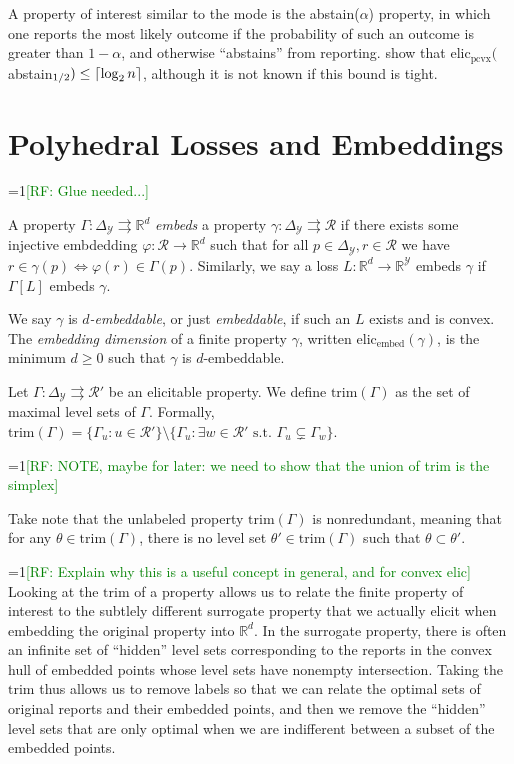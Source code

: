 \documentclass[anon,12pt]{colt2019}
\newcommand{\Comments}{1}
\newcommand{\mynote}[2]{\ifnum\Comments=1\textcolor{#1}{#2}\fi}
\newcommand{\raf}[1]{\mynote{green}{[RF: #1]}}
\newcommand{\reals}{\mathbb{R}}
\newcommand{\prop}[1]{\Gamma[#1]}
\newcommand{\elicpoly}{\mathrm{elic}_\mathrm{pcvx}}
\newcommand{\elicembed}{\mathrm{elic}_\mathrm{embed}}
\newcommand{\simplex}{\Delta_\Y}
\newcommand{\R}{\mathcal{R}}
\newcommand{\Y}{\mathcal{Y}}
\newcommand{\toto}{\rightrightarrows}
\newcommand{\trim}{\mathrm{trim}}
\DeclarePairedDelimiter\ceil{\lceil}{\rceil}
\begin{document}
A property of interest similar to the mode is the abstain($\alpha$) property, in which one reports the most likely outcome if the probability of such an outcome is greater than $1-\alpha$, and otherwise ``abstains'' from reporting.
\cite{ramaswamy2018consistent} show that $\elicpoly($abstain$_{1/2}) \leq \ceil{\log_2 n}$, although it is not known if this bound is tight.


\section{Polyhedral Losses and Embeddings}

\raf{Glue needed...}
\begin{definition}
  A property $\Gamma : \simplex \toto \reals^d$ \emph{embeds} a property $\gamma : \simplex \toto \R$ if there exists some injective embdedding $\varphi:\R\to\reals^d$ such that for all $p\in\simplex,r\in\R$ we have $r \in \gamma(p) \iff \varphi(r) \in \Gamma(p)$.
  Similarly, we say a loss $L:\reals^d\to\reals^\Y$ embeds $\gamma$ if $\prop{L}$ embeds $\gamma$.
\end{definition}

\begin{definition}
  We say $\gamma$ is \emph{$d$-embeddable}, or just \emph{embeddable}, if such an $L$ exists and is convex.
  The \emph{embedding dimension} of a finite property $\gamma$, written $\elicembed(\gamma)$, is the minimum $d\geq 0$ such that $\gamma$ is $d$-embeddable.
\end{definition}

\begin{definition}\label{def:trim}
  Let $\Gamma:\simplex \toto\R'$ be an elicitable property.
  We define $\trim(\Gamma)$ as the set of maximal level sets of $\Gamma$.
  Formally, $\trim(\Gamma) = \{\Gamma_u : u \in \R'\} \setminus \{ \Gamma_u : \exists w \in \R' \text{ s.t. } \Gamma_u \subsetneq \Gamma_w \}$.
\end{definition}
\raf{NOTE, maybe for later: we need to show that the union of trim is the simplex}

Take note that the unlabeled property $\trim(\Gamma)$ is nonredundant, meaning that for any $\theta \in \trim(\Gamma)$, there is no level set $\theta' \in \trim(\Gamma)$ such that $\theta \subset \theta'$.

\raf{Explain why this is a useful concept in general, and for convex elic}
Looking at the $\trim$ of a property allows us to relate the finite property of interest to the subtlely different surrogate property that we actually elicit when embedding the original property into $\reals^d$.
In the surrogate property, there is often an infinite set of ``hidden'' level sets corresponding to the reports in the convex hull of embedded points whose level sets have nonempty intersection.
Taking the $\trim$ thus allows us to remove labels so that we can relate the optimal sets of original reports and their embedded points, and then we remove the ``hidden'' level sets that are only optimal when we are indifferent between a subset of the embedded points.
\end{document}
